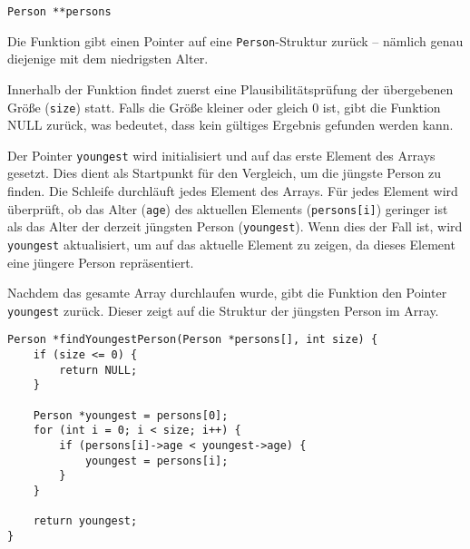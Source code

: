 \texttt{Person **persons}

Die Funktion gibt einen Pointer auf eine \texttt{Person}-Struktur zurück
-- nämlich genau diejenige mit dem niedrigsten Alter.

Innerhalb der Funktion findet zuerst eine Plausibilitätsprüfung der übergebenen
Größe (\texttt{size}) statt. Falls die Größe kleiner oder gleich 0 ist,
gibt die Funktion NULL zurück, was bedeutet, dass kein gültiges Ergebnis
gefunden werden kann.

Der Pointer \texttt{youngest} wird initialisiert und auf das erste
Element des Arrays gesetzt. Dies dient als Startpunkt für den Vergleich, um die
jüngste Person zu finden. Die Schleife durchläuft jedes Element des Arrays. Für
jedes Element wird überprüft, ob das Alter (\texttt{age}) des aktuellen
Elements (\texttt{persons[i]}) geringer ist als das Alter der derzeit
jüngsten Person (\texttt{youngest}). Wenn dies der Fall ist, wird
\texttt{youngest} aktualisiert, um auf das aktuelle Element zu zeigen, da
dieses Element eine jüngere Person repräsentiert.

Nachdem das gesamte Array durchlaufen wurde, gibt die Funktion den Pointer
\texttt{youngest} zurück. Dieser zeigt auf die Struktur der jüngsten
Person im Array.

\begin{verbatim}
Person *findYoungestPerson(Person *persons[], int size) {
    if (size <= 0) {
        return NULL;
    }

    Person *youngest = persons[0];
    for (int i = 0; i < size; i++) {
        if (persons[i]->age < youngest->age) {
            youngest = persons[i];
        }
    }

    return youngest;
}
\end{verbatim}
